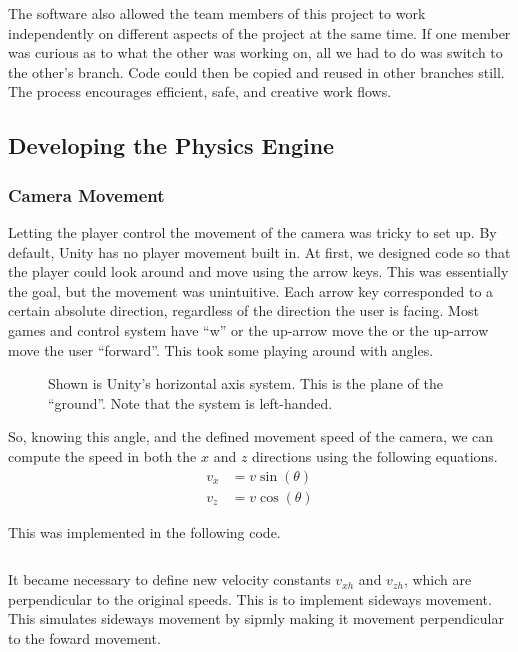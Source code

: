 \documentclass[12pt]{article}
\begin{document}
The software also allowed the team members of this project to work independently on different aspects of the project at the same time. If one member was curious as to what the other was working on, all we had to do was switch to the other's branch. Code could then be copied and reused in other branches still. The process encourages efficient, safe, and creative work flows.  


\subsection{Developing the Physics Engine}

\subsubsection{Camera Movement}

Letting the player control the movement of the camera was tricky to set up. By default, Unity has no player movement built in. At first, we designed code so that the player could look around and move using the arrow keys. This was essentially the goal, but the movement was unintuitive. Each arrow key corresponded to a certain absolute direction, regardless of the direction the user is facing. Most games and control system have \enquote{w} or the up-arrow move the or the up-arrow move the user \enquote{forward}. This took some playing around with angles.

\begin{figure}[h]
  \centering
  
  \caption{Shown is Unity's horizontal axis system. This is the plane of the \enquote{ground}. Note that the system is left-handed.}
\end{figure}

So, knowing this angle, and the defined movement speed of the camera, we can compute the speed in both the $x$ and $z$ directions using the following equations.
\begin{align}
v_x &= v \sin(\theta) \\
v_z &= v \cos(\theta)
\end{align}

This was implemented in the following code.
\inputminted[firstline=12,lastline=29,linenos,fontsize=\footnotesize,bgcolor=codebg]{csharp}{../unity/Assets/Scripts/Engine/FreeCamera.cs}

It became necessary to define new velocity constants $v_\mathit{xh}$ and $v_\mathit{zh}$, which are perpendicular to the original speeds. This is to implement sideways movement. This simulates sideways movement by sipmly making it movement perpendicular to the foward movement.
\end{document}
